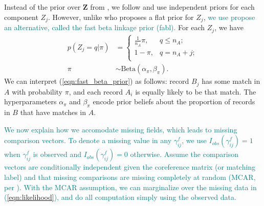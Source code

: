 \documentclass[ba]{imsart}
\begin{document}
Instead of the prior over $\bm{Z}$ from \cite{sadinle_bayesian_2017}, we follow \cite{wortman2019} and use independent priors for each component $Z_j$. However, unlike \cite{wortman2019} who proposes a flat prior for $Z_j$, 
\textcolor{teal}{we use propose an alternative, called the fast beta linkage prior (fabl).}
For each $Z_j$, we have
\begin{subequations}
\begin{align}
	p(Z_j = q| \pi) &= \begin{cases} 
	\frac{1}{n_A}\pi,  & q \leq n_A;\\
	1-\pi, &  q  = n_A + j;  \\
\end{cases} \label{eqn:fast_beta_prior}  \\
\pi &\sim \text{Beta}(\alpha_{\pi}, \beta_{\pi}) \label{eqn:fast_beta_prior2}.
\end{align}
\end{subequations}
We can interpret (\ref{eqn:fast_beta_prior}) as follows: record $B_j$ has some match in $A$ with probability $\pi$, and each record $A_i$ is equally likely to be that match. The hyperparameters $\alpha_{\pi}$ and $\beta_{\pi}$ encode prior beliefs about  the proportion of records in $B$ that have matches in $A.$ 


\textcolor{teal}{We now explain how we accomodate missing fields, which leads to missing comparison vectors. To denote a missing value in any $\gamma_{ij}^f$, we use $I_{obs}(\gamma_{ij}^f)=1$ when $\gamma_{ij}^f$ is observed and $I_{obs}(\gamma_{ij}^f)=0$ otherwise. Assume the comparison vectors are conditionally independent given the coreference matrix (or matching label) and that missing comparisons are missing completely at random (MCAR, per \cite{LittleRubin2002}). With the MCAR assumption, we can marginalize over the missing data in (\ref{eqn:likelihood}), and do all computation simply using the observed data.}
\end{document}
